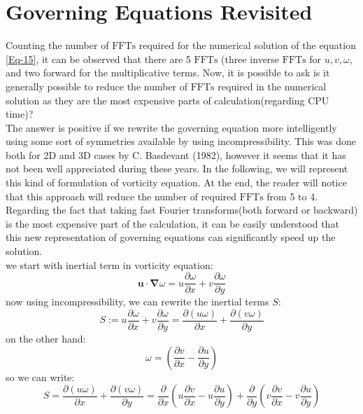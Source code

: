 \documentclass[12pt]{article}
\def\grad{\bm{\nabla}}
\def\u{\bm{u}}
\begin{document}
\section{Governing Equations Revisited}
Counting the number of $\text{FFTs}$ required for the numerical solution of the equation \eqref{Eq-15}, it can be observed that there are 5 $\text{FFTs}$ (three inverse $\text{FFTs}$ for $u,v,\omega$, and two forward for the multiplicative terms. Now, it is possible to ask is it generally possible to reduce the number of $\text{FFTs}$ required in the numerical solution as they are the most expensive parts of calculation(regarding CPU time)?\\
The answer is positive if we rewrite the governing equation more intelligently using some sort of symmetries available by using incompressibility. This was done both for 2D and 3D cases by C. Basdevant (1982), however it seems that it has not been well appreciated during these years. In the following, we will represent this kind of formulation of vorticity equation. At the end, the reader will notice that this approach will reduce the number of required $\text{FFTs}$ from 5 to 4. Regarding the fact that taking fast Fourier transforms(both forward or backward) is the most expensive part of the calculation, it can be easily understood that this new representation of governing equations can significantly speed up the solution. \\
we start with inertial term in vorticity equation:
%
\begin{equation}\label{Eq-16}
\u\cdot\grad\omega=u\dfrac{\partial \omega}{\partial x}+v\dfrac{\partial \omega}{\partial y}
\end{equation}
%
now using incompressibility, we can rewrite the inertial terms $S$:
%
\begin{equation}\label{Eq-17}
S :=u\dfrac{\partial \omega}{\partial x}+v\dfrac{\partial \omega}{\partial y}=\dfrac{\partial (u\omega)}{\partial x}+\dfrac{\partial (v\omega)}{\partial y}
\end{equation}
%
on the other hand:
%
\begin{equation}\label{Eq-18}
\omega=\left(\dfrac{\partial v}{\partial x}-\dfrac{\partial u}{\partial y}\right)
\end{equation}
%
so we can write:
%
\begin{equation}\label{Eq-19}
S =\dfrac{\partial (u\omega)}{\partial x}+\dfrac{\partial (v\omega)}{\partial y}=\dfrac{\partial}{\partial x} \left(u\dfrac{\partial v}{\partial x}-u\dfrac{\partial u}{\partial y}\right)+\dfrac{\partial}{\partial y} \left(v\dfrac{\partial v}{\partial x}-v\dfrac{\partial u}{\partial y}\right)
\end{equation}
\end{document}

